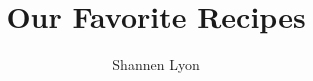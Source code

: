 \documentclass[a4paper, twoside,10pt]{article}
\begin{document}
\title{Our Favorite Recipes}
\author{Shannen Lyon}
\maketitle

\tableofcontents
{}

\newpage
\end{document}
